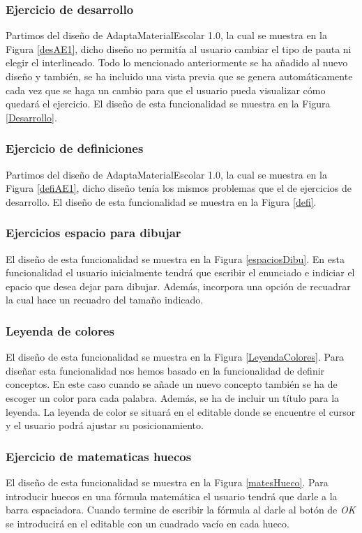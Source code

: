 \subsubsection{Ejercicio de desarrollo}
 Partimos del diseño de AdaptaMaterialEscolar 1.0, la cual se muestra en la Figura \ref{desAE1}, dicho diseño no permitía al usuario cambiar el tipo de pauta ni elegir el interlineado. Todo lo mencionado anteriormente se ha añadido al nuevo diseño y también, se ha incluido una vista previa que se genera automáticamente cada vez que se haga un cambio para que el usuario pueda visualizar cómo quedará el ejercicio. El diseño de esta funcionalidad se muestra en la Figura \ref{Desarrollo}.    

 \subsubsection{Ejercicio de definiciones}
 Partimos del diseño de AdaptaMaterialEscolar 1.0, la cual se muestra en la Figura \ref{defiAE1}, dicho diseño tenía los mismos problemas que el de ejercicios de desarrollo. El diseño de esta funcionalidad se muestra en la Figura \ref{defi}.

 \subsubsection{Ejercicios espacio para dibujar}
 El diseño de esta funcionalidad se muestra en la Figura \ref{espaciosDibu}. En esta funcionalidad el usuario inicialmente tendrá que escribir el enunciado e indiciar el epacio que desea dejar para dibujar. Además, incorpora una opción de recuadrar la cual hace un recuadro del tamaño indicado.  

 \subsubsection{Leyenda de colores}
 El diseño de esta funcionalidad se muestra en la Figura \ref{LeyendaColores}. Para diseñar esta funcionalidad nos hemos basado en la funcionalidad de definir conceptos. En este caso cuando se añade un nuevo concepto también se ha de escoger un color para cada palabra. Además, se ha de incluir un título para la leyenda. La leyenda de color se situará en el editable donde se encuentre el cursor y el usuario podrá ajustar su posicionamiento.

 \subsubsection{Ejercicio de matematicas huecos}
 El diseño de esta funcionalidad se muestra en la Figura \ref{matesHueco}. Para introducir huecos en una fórmula matemática el usuario tendrá que darle a la barra espaciadora. Cuando termine de escribir la fórmula al darle al botón de \textit{OK} se introducirá en el editable con un cuadrado vacío en cada hueco.

